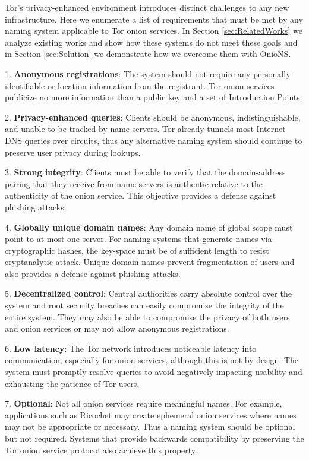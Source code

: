 \documentclass[USenglish,oneside,twocolumn]{article}
\begin{document}
Tor's privacy-enhanced environment introduces distinct challenges to any new infrastructure. Here we enumerate a list of requirements that must be met by any naming system applicable to Tor onion services. In Section \ref{sec:RelatedWorks} we analyze existing works and show how these systems do not meet these goals and in Section \ref{sec:Solution} we demonstrate how we overcome them with OnioNS.

1. \textbf{Anonymous registrations}: The system should not require any personally-identifiable or location information from the registrant. Tor onion services publicize no more information than a public key and a set of Introduction Points.

2. \textbf{Privacy-enhanced queries}: Clients should be anonymous, indistinguishable, and unable to be tracked by name servers. Tor already tunnels most Internet DNS queries over circuits, thus any alternative naming system should continue to preserve user privacy during lookups.

3. \textbf{Strong integrity}: Clients must be able to verify that the domain-address pairing that they receive from name servers is authentic relative to the authenticity of the onion service. This objective provides a defense against phishing attacks.

4. \textbf{Globally unique domain names}: Any domain name of global scope must point to at most one server. For naming systems that generate names via cryptographic hashes, the key-space must be of sufficient length to resist cryptanalytic attack. Unique domain names prevent fragmentation of users and also provides a defense against phishing attacks.

5. \textbf{Decentralized control}: Central authorities carry absolute control over the system and root security breaches can easily compromise the integrity of the entire system. They may also be able to compromise the privacy of both users and onion services or may not allow anonymous registrations.

6. \textbf{Low latency}: The Tor network introduces noticeable latency into communication, especially for onion services, although this is not by design. The system must promptly resolve queries to avoid negatively impacting usability and exhausting the patience of Tor users.

7. \textbf{Optional}: Not all onion services require meaningful names. For example, applications such as Ricochet \cite{RicochetGithub} may create ephemeral onion services where names may not be appropriate or necessary. Thus a naming system should be optional but not required. Systems that provide backwards compatibility by preserving the Tor onion service protocol also achieve this property.
\end{document}

